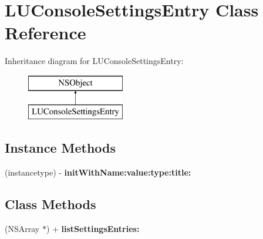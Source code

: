 \hypertarget{interface_l_u_console_settings_entry}{}\section{L\+U\+Console\+Settings\+Entry Class Reference}
\label{interface_l_u_console_settings_entry}
Inheritance diagram for L\+U\+Console\+Settings\+Entry\+:\begin{figure}[H]
\begin{center}
\leavevmode
\includegraphics[height=2.000000cm]{interface_l_u_console_settings_entry}
\end{center}
\end{figure}
\subsection*{Instance Methods}
\begin{DoxyCompactItemize}
\item 
\mbox{\label{interface_l_u_console_settings_entry_ae10a20e2d8e5e6aa5de76846021713dd}} 
(instancetype) -\/ {\bfseries init\+With\+Name\+:value\+:type\+:title\+:}
\end{DoxyCompactItemize}
\subsection*{Class Methods}
\begin{DoxyCompactItemize}
\item 
\mbox{\label{interface_l_u_console_settings_entry_aa0c6616b691498feaadf85f170ad68b3}} 
(N\+S\+Array $\ast$) + {\bfseries list\+Settings\+Entries\+:}
\end{DoxyCompactItemize}
